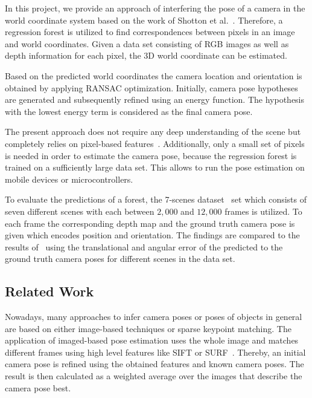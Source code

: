 \documentclass[final]{cvpr}
\begin{document}
In this project, we provide an approach of interfering the pose of a camera in the world coordinate system
based on the work of Shotton et al.~\cite{shotton2013}. Therefore, a regression forest is utilized to find correspondences
between pixels in an image and world coordinates. Given a data set
consisting of RGB images as well as depth information for each pixel, the 3D world coordinate can be estimated.

Based on the predicted world coordinates the camera location and orientation is obtained by applying RANSAC
optimization. Initially, camera pose hypotheses are generated and subsequently refined using an energy function.
The hypothesis with the lowest energy term is considered as the final camera pose. 

The present approach does not require any deep understanding of the scene but completely relies on 
pixel-based features~\cite{shotton2013}. Additionally, only a small set of pixels is needed in order to estimate 
the camera pose, because the regression forest is trained on a sufficiently large data set. This allows to 
run the pose estimation on mobile devices or microcontrollers.

To evaluate the predictions of a forest, the 7-scenes dataset~\cite{glocker2013} set which consists of seven 
different scenes with each between $2,000$ and $12,000$ frames is utilized. To each frame the corresponding 
depth map and the ground truth camera pose is given which encodes position and orientation. The findings are 
compared to the results of~\cite{shotton2013} using the translational and angular error of 
the predicted to the ground truth camera poses for different scenes in the data set.


\subsection{Related Work}
Nowadays, many approaches to infer camera poses or poses of objects in general are based on either image-based techniques or 
sparse keypoint matching. The application of imaged-based pose estimation uses the whole image and matches different frames 
using high level features like \ac{SIFT} or \ac{SURF}~\cite{Klein2008}. Thereby, an initial camera pose is refined using 
the obtained features and known camera poses. The result is then calculated as a weighted average over the 
images that describe the camera pose best. 
\end{document}
